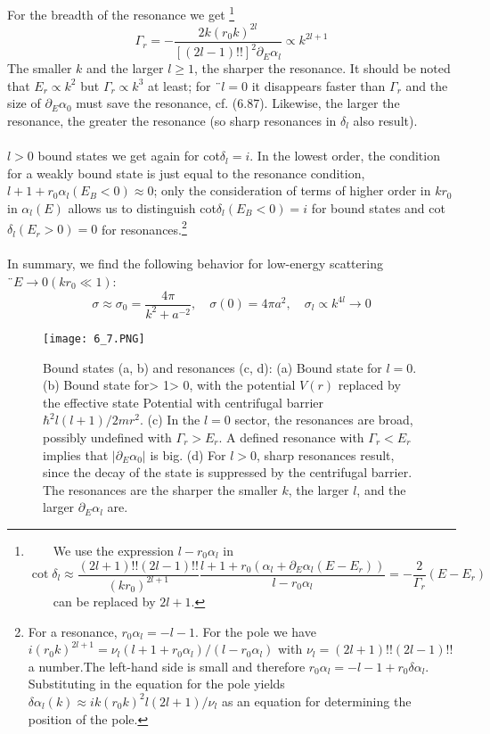 For the breadth of the resonance we get \footnote{
    We use the expression $l - r_0\alpha_l$ in
\begin{equation}
    \cot \delta_{l} \approx \frac{(2 l+1) ! !(2 l-1) ! !}{\left(k r_{0}\right)^{2 l+1}} \frac{l+1+r_{0}\left(\alpha_{l}+\partial_{E} \alpha_{l}\left(E-E_{r}\right)\right)}{l-r_{0} \alpha_{l}}=-\frac{2}{\Gamma_{r}}\left(E-E_{r}\right)
    \end{equation}
    can be replaced by $2l + 1$.}
\begin{equation}
    \Gamma_{r}=-\frac{2 k\left(r_{0} k\right)^{2 l}}{[(2 l-1) ! !]^{2} \partial_{E} \alpha_{l}} \propto k^{2 l+1}
    \end{equation}
The smaller $k$ and the larger $l ≥ 1$, the sharper the resonance. It should be noted that $E_r\propto k^2$ but $\Gamma_r\propto k^3$ at least; for $¨ l = 0$ it disappears faster than $\Gamma_r$ and the size of $\partial_E\alpha_0$ must save the resonance, cf. (6.87). Likewise, the larger the resonance, the greater the resonance (so sharp resonances in $\delta_l$ also result).\\\\
$l> 0$ bound states we get again for cot$\delta_l = i$. In the lowest order, the condition for a weakly bound state is just equal to the resonance condition, $l + 1 + r_0\alpha_l (E_B <0) \approx 0$; only the consideration of terms of higher order in $kr_0$ in $\alpha_l (E)$ allows us to distinguish cot$\delta_l (E_B <0) = i$ for bound states and cot$\delta_l (E_r> 0) = 0$ for resonances.\footnote{For a resonance, $r_0\alpha_l = -l-1$. For the pole we have $i (r_0k)^{2l + 1} = \nu_l (l + 1 + r_0\alpha_l) / (l-r_0\alpha_l)$ with $\nu_l = (2l + 1) !! (2l - 1) !!$ a number.The left-hand side is small and therefore $r_0\alpha_l = -l -1 + r_0\delta\alpha_l$. Substituting in the equation for the pole yields $\delta\alpha_l (k) \approx ik (r_0k)^2l (2l + 1) / \nu_l$ as an equation for determining the position of the pole.}
\\\\
In summary, we find the following behavior for low-energy scattering $¨ E \rightarrow 0 (kr_0\ll 1)$:
$$
    \sigma \approx \sigma_{0}=\frac{4 \pi}{k^{2}+a^{-2}}, \quad \sigma(0)=4 \pi a^{2}, \quad \sigma_{l} \propto k^{4 l} \rightarrow 0
$$
\begin{figure}[ht]
        \centering
        \texttt{[image: 6\_7.PNG]}
        \caption{Bound states (a, b) and resonances (c, d): (a) Bound state for $l = 0$. (b) Bound state for> 1> 0, with the potential $V (r)$ replaced by the effective state Potential with centrifugal barrier $\hbar^2l (l +1) / 2mr^2$. (c) In the $l = 0$ sector, the resonances are broad, possibly undefined with $\Gamma_r> E_r$. A defined resonance with $\Gamma_r <E_r$ implies that $| \partial_E\alpha_0 |$ is big. (d) For $l> 0$, sharp resonances result, since the decay of the state is suppressed by the centrifugal barrier. The resonances are the sharper the smaller $k$, the larger $l$, and the larger $\partial_E\alpha_l$ are.}
\end{figure}
